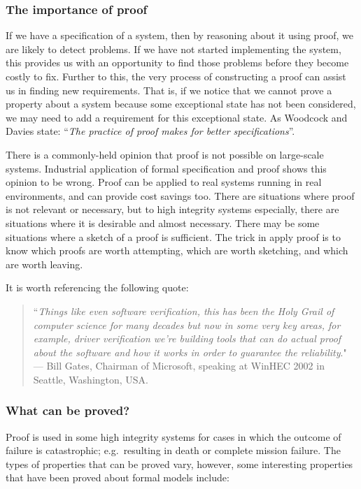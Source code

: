 \subsubsection*{The importance of proof}

If we have a specification of a system, then by reasoning about it using proof, we are likely to detect problems. If we have not started implementing the system, this provides us with an opportunity to find those problems before they become costly to fix. Further to this, the very process of constructing a proof can assist us in finding new requirements. That is, if we notice that we cannot prove a property about a system because some exceptional state has not been considered, we may need to add a requirement for this exceptional state. As Woodcock and Davies state: ``\emph{The practice of proof makes for better specifications}''.

There is a commonly-held opinion that proof is not possible on large-scale systems. Industrial application of formal specification and proof shows this opinion to be wrong. Proof can be applied to real systems running in real environments, and can provide cost savings too. There are situations where proof is not relevant or necessary, but to high integrity systems especially, there are situations where it is desirable and almost necessary. There may be some situations where a sketch of a proof is sufficient. The trick in apply proof is to know which proofs are worth attempting, which are worth sketching, and which are worth leaving.

It is worth referencing the following quote:

\begin{quote}
``\emph{Things like even software verification, this has been the Holy Grail of computer science for many decades but now in some very key areas, for example, driver verification we're building tools that can do actual proof about the software and how it works in order to guarantee the reliability}." --- Bill Gates, Chairman of Microsoft, speaking at WinHEC 2002 in Seattle, Washington, USA.
\end{quote}

\subsubsection*{What can be proved?}

Proof is used in some high integrity systems for cases in which the outcome of failure is catastrophic; e.g.\ resulting in death or complete mission failure. The types of properties that can be proved vary, however, some interesting properties that have been proved about formal models include:

